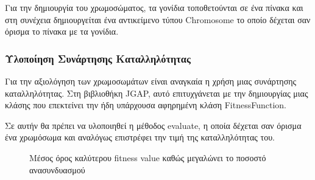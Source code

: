 Για την δημιουργία του χρωμοσώματος, τα γονίδια τοποθετούνται σε ένα πίνακα και στη συνέχεια δημιουργείται ένα αντικείμενο τύπου Chromosome το οποίο δέχεται σαν όρισμα το πίνακα με τα γονίδια.

\subsubsection{Υλοποίηση Συνάρτησης Καταλληλότητας}

Για την αξιολόγηση των χρωμοσωμάτων είναι αναγκαία η χρήση μιας συνάρτησης καταλληλότητας. Στη βιβλιοθήκη JGAP, αυτό επιτυχγάνεται με την δημιουργίας μιας κλάσης που επεκτείνει την ήδη υπάρχουσα αφηρημένη κλάση FitnessFunction.

Σε αυτήν θα πρέπει να υλοποιηθεί η μέθοδος evaluate, η οποία δέχεται σαν όρισμα ένα χρωμόσωμα και αναλόγως επιστρέφει την τιμή της καταλληλότητας του.






\begin{figure}[!t]
    \centering
    \caption{Μέσος όρος καλύτερου fitness value καθώς μεγαλώνει το ποσοστό ανασυνδυασμού}
    \label{fig_crossover}
\end{figure}

